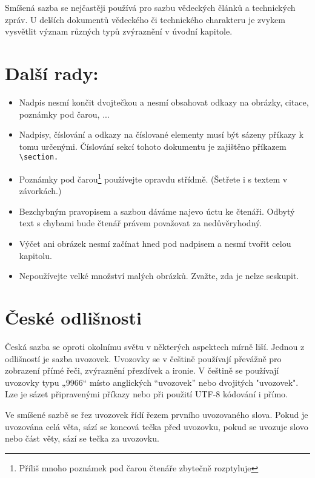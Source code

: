 \documentclass[a4paper,twocolumn,10pt]{article}
\begin{document}
Smíšená sazba se nejčastěji používá pro sazbu vědeckých článků a technických zpráv. U delších dokumentů
vědeckého či technického charakteru je zvykem vysvětlit
význam různých typů zvýraznění v úvodní kapitole.

\section{Další rady:}
\begin{itemize}
\item Nadpis nesmí končit dvojtečkou a nesmí obsahovat
odkazy na obrázky, citace, poznámky pod čarou, ...
\item Nadpisy, číslování a odkazy na číslované elementy
musí být sázeny příkazy k tomu určenými. Číslování sekcí tohoto dokumentu je zajištěno příkazem \verb! \section.!
\item Poznámky pod čarou\footnote{Příliš mnoho poznámek pod čarou čtenáře zbytečně rozptyluje} používejte opravdu střídmě.
(Šetřete i s textem v závorkách.)
\item Bezchybným pravopisem a sazbou dáváme najevo
úctu ke čtenáři. Odbytý text s chybami bude čtenář
právem považovat za nedůvěryhodný.
\item Výčet ani obrázek nesmí začínat hned pod nadpisem
a nesmí tvořit celou kapitolu.
\item Nepoužívejte velké množství malých obrázků. Zvažte,
zda je nelze seskupit.
\end{itemize}

\section{České odlišnosti}
Česká sazba se oproti okolnímu světu v některých aspektech mírně liší. Jednou z odlišností je sazba uvozovek. Uvozovky se v češtině používají převážně pro zobrazení přímé
řeči, zvýraznění přezdívek a ironie. V češtině se používají
uvozovky typu „9966“ místo anglických “uvozovek” nebo
dvojitých "uvozovek". Lze je sázet připravenými příkazy
nebo při použití UTF-8 kódování i přímo.
\par

Ve smíšené sazbě se řez uvozovek řídí řezem prvního
uvozovaného slova. Pokud je uvozována celá věta, sází se
koncová tečka před uvozovku, pokud se uvozuje slovo nebo
část věty, sází se tečka za uvozovku.
\par
\end{document}
